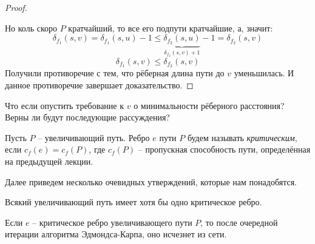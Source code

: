 \begin{proof}
\begin{figure}[h]
    \end{figure}
    Но коль скоро $P$ кратчайший, то все его подпути кратчайшие, а, значит:
    \begin{equation*}
        \delta_{f_1}(s, v) = \delta_{f_1}(s, u) - 1 \leq \underbrace{\delta_{f_2}(s, u)}_{\delta_{f_2}(s, v) + 1} - 1 = \delta_{f_2}(s, v)
    \end{equation*}
    \begin{equation*}
        \delta_{f_1}(s, v) \leq \delta_{f_2}(s, v)
    \end{equation*}
    Получили противоречие с тем, что рёберная длина пути до $v$ уменьшилась. И данное противоречие завершает доказательство.

\end{proof}

\Exe Что если опустить требование к $v$ о минимальности рёберного расстояния? Верны ли будут последующие рассуждения?

\Def Пусть $P$ -- увеличивающий путь. Ребро $e$ пути $P$ будем называть \textit{критическим}, если $c_f(e) = c_f(P)$, где $c_f(P)$ -- пропускная способность пути, определённая на предыдущей лекции.

Далее приведем несколько очевидных утверждений, которые нам понадобятся.

\St Всякий увеличивающий путь имеет хотя бы одно критическое ребро.

\St Если $e$ -- критическое ребро увеличивающего пути $P$, то после очередной итерации алгоритма Эдмондса-Карпа, оно исчезнет из сети.


